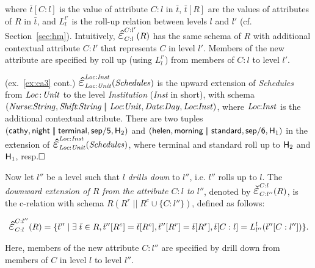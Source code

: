 \documentclass[format=acmsmall, review=false, screen=true]{acmart}
\newcommand{\upext}[3]{\scalebox{1.5}{\ensuremath{\hat{\varepsilon}}}_{#1}^{#2}(#3)}
\newcommand{\downext}[3]{\scalebox{1.5}{\ensuremath{\check{\varepsilon}}}_{#1}^{#2}(#3)}
\newcommand{\boxtheorem}{\ensuremath{\hfill \Box}}
\newcommand{\nit}[1]{{\it #1}}
\newcommand{\vectt}[1]{\bar{#1}}
\begin{document}
{\noindent where $\vectt{t}[C:l]$ is the value of attribute $C:l$ in $\vectt{t}$, $\vectt{t}[R]$ are the values of attributes of $R$ in $\vectt{t}$, and $L_{l}^{l'}$ is the roll-up relation between levels $l$ and $l'$ (cf. Section~\ref{sec:hm}). Intuitively, $\upext{C:l}{C:l'}{R}$ has the same schema of $R$ with additional contextual attribute $C:l'$ that represents $C$ in level $l'$. Members of the new attribute are specified by roll up (using $L_{l}^{l'}$) from members of $C:l$ to level $l'$.

\begin{example} \label{ex:ca4} (ex.~\ref{ex:ca3} cont.)  $\upext{\nit{Loc}:\nit{Unit}}{\nit{Loc}:\nit{Inst}}{\nit{Schedules}}$ is the upward extension of \nit{Schedules} from $\nit{Loc}\!:\!\nit{Unit}$ to the level \nit{Institution} (\nit{Inst} in short), with schema $(\nit{Nurse}\!\!:\!\!\nit{String},\nit{Shift}\!\!:\!\!\nit{String}\;|\!|\;\nit{Loc}\!\!:\!\!\nit{Unit},\nit{Date}\!\!:\!\!\nit{Day},\nit{Loc}\!\!:\!\!\nit{Inst})$, where $\nit{Loc}\!\!:\!\!\nit{Inst}$ is the additional contextual attribute. There are two tuples $({\sf cathy},{\sf night}\;|\!|\;{\sf terminal},{\sf sep/5}, {\sf H}_2)$ and $({\sf helen},{\sf morning}\;|\!|\;{\sf standard},{\sf sep/6}, {\sf H}_1)$ in the extension of $\upext{\nit{Loc}:\nit{Unit}}{\nit{Loc}:\nit{Inst}}{\nit{Schedules}}$, where {\sf terminal} and {\sf standard} roll up to ${\sf H}_2$ and ${\sf H}_1$, resp.\boxtheorem
\end{example}

Now let $l''$ be a level such that $l$ {\em drills down} to $l''$, i.e. $l''$ rolls up to $l$. The {\em downward extension of $R$ from the attribute $C:l$ to $l''$}, denoted by $\downext{C:l''}{C:l}{R}$, is the c-relation with schema $R(R^r\;\!|\!|\;R^c \cup \{C:l''\})$, defined as follows:

\vspace{-4mm}
\begin{align*}%
\upext{C:l}{C:l''}{R}=\{\vectt{t}''\;|\;\exists \;\vectt{t} \in R, \vectt{t}''[R^c]=\vectt{t}[R^c], \vectt{t}''[R^r]=\vectt{t}[R^r], \vectt{t}[C:l]=L_{l''}^{l}(\vectt{t}''[C:l''])\}.
\end{align*}
\vspace{-4mm}

\noindent Here, members of the new attribute $C:l''$ are specified by drill down from members of $C$ in level $l$ to level $l''$.

}
\end{document}
